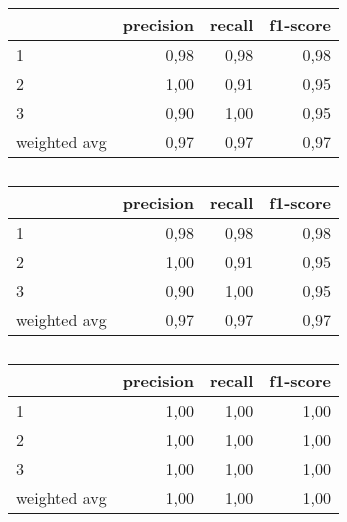 \begin{table}
\centering
\caption{}%
\begin{tabular}{lrrr}
\toprule
{} &  precision &  recall &  f1-score \\
\midrule
1            &       0,98 &    0,98 &      0,98 \\
2            &       1,00 &    0,91 &      0,95 \\
3            &       0,90 &    1,00 &      0,95 \\
weighted avg &       0,97 &    0,97 &      0,97 \\
\bottomrule
\end{tabular}
\end{table}

\begin{table}
\centering
\caption{}%
\begin{tabular}{lrrr}
\toprule
{} &  precision &  recall &  f1-score \\
\midrule
1            &       0,98 &    0,98 &      0,98 \\
2            &       1,00 &    0,91 &      0,95 \\
3            &       0,90 &    1,00 &      0,95 \\
weighted avg &       0,97 &    0,97 &      0,97 \\
\bottomrule
\end{tabular}
\end{table}

\begin{table}
\centering
\caption{}%
\begin{tabular}{lrrr}
\toprule
{} &  precision &  recall &  f1-score \\
\midrule
1            &       1,00 &    1,00 &      1,00 \\
2            &       1,00 &    1,00 &      1,00 \\
3            &       1,00 &    1,00 &      1,00 \\
weighted avg &       1,00 &    1,00 &      1,00 \\
\bottomrule
\end{tabular}
\end{table}

